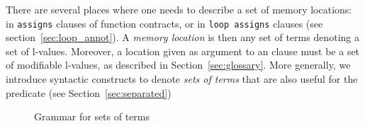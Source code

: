 There are several places where one needs to describe a set of memory
locations: in \lstinline|assigns| clauses of function contracts, or
in \lstinline|loop assigns| clauses (see section~\ref{sec:loop_annot}).
A \emph{memory location} is then any set of terms denoting a set of
l-values. Moreover, a location given as argument to
an \assigns{} clause must be a set of modifiable l-values, as described in
Section~\ref{sec:glossary}. 
More generally, we introduce syntactic constructs to denote \emph{sets of
  terms} that are also useful for the \separated predicate (see Section~\ref{sec:separated})

\begin{figure}
  \begin{cadre}
      
    \end{cadre}
  \caption{Grammar for sets of terms}
\label{fig:gram:locations}
\end{figure}

